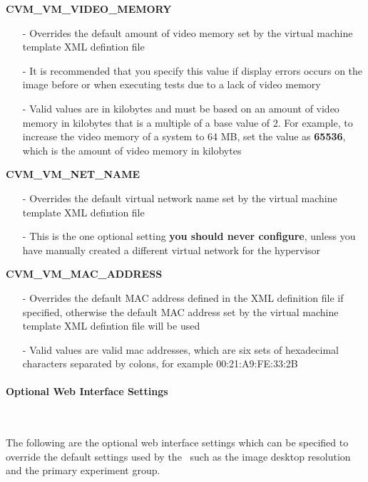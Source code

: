 \begin{description}
\item {\bf CVM\_VM\_VIDEO\_MEMORY}
		\begin{itemize}
		\item[-]	Overrides the default amount of video memory set by the virtual machine
				template XML defintion file
		\item[-]	It is recommended that you specify this value if display errors occurs on the
				\cernvm image before or when executing tests due to a lack of video memory
		\item[-]	Valid values are in kilobytes and must be based on an amount of video memory in
				kilobytes that is a multiple of a base value of 2. For example, to increase
				the video memory of a system to 64 MB, set the value as {\bf 65536}, which is the
				amount of video memory in kilobytes
		\end{itemize}
		
\item {\bf CVM\_VM\_NET\_NAME}
		\begin{itemize}
		\item[-]	Overrides the default virtual network name set by the virtual machine
				template XML defintion file
		\item[-]	This is the one optional setting {\bf you should never configure}, unless you have
	  			manually created a different virtual network for the hypervisor
		\end{itemize}

\item {\bf CVM\_VM\_MAC\_ADDRESS}
		\begin{itemize}
		\item[-]	Overrides the default MAC address defined in the XML definition file if specified,
					otherwise the default MAC address set by the virtual machine template XML 
					defintion file will be used
		\item[-]	Valid values are valid mac addresses, which are six sets of hexadecimal characters
					separated by colons, for example 00:21:A9:FE:33:2B
		\end{itemize}
\end{description}


\paragraph*{Optional Web Interface Settings}~\newline

The following are the optional web interface settings which can be specified to override
the default settings used by the \cernvmtestframework\, such as the \cernvm image desktop
resolution and the primary experiment group.

